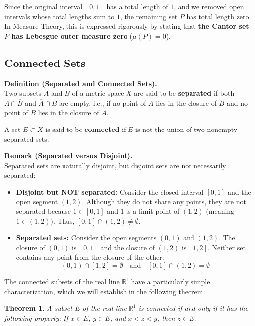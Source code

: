 \documentclass{article}
\theoremstyle{mythm}
\newtheorem{theorem}{Theorem}[section]
\begin{document}
Since the original interval $[0, 1]$ has a total length of $1$, and we removed open intervals whose total lengths sum to $1$, the remaining set $P$ has total length zero. In Measure Theory, this is expressed rigorously by stating that \textbf{the Cantor set $P$ has Lebesgue outer measure zero} ($\mu(P) = 0$).
\subsection*{Connected Sets}

\textbf{Definition (Separated and Connected Sets).} \\
Two subsets $A$ and $B$ of a metric space $X$ are said to be \textbf{separated} if both $A \cap \overline{B}$ and $\overline{A} \cap B$ are empty, i.e., if no point of $A$ lies in the closure of $B$ and no point of $B$ lies in the closure of $A$.

A set $E \subset X$ is said to be \textbf{connected} if $E$ is not the union of two nonempty separated sets.


\textbf{Remark (Separated versus Disjoint).} \\
Separated sets are naturally disjoint, but disjoint sets are not necessarily separated:
\begin{itemize}
    \item \textbf{Disjoint but NOT separated:} Consider the closed interval $[0, 1]$ and the open segment $(1, 2)$. Although they do not share any points, they are not separated because $1 \in [0, 1]$ and $1$ is a limit point of $(1, 2)$ (meaning $1 \in \overline{(1, 2)}$). Thus, $[0, 1] \cap \overline{(1, 2)} \neq \emptyset$.
    \item \textbf{Separated sets:} Consider the open segments $(0, 1)$ and $(1, 2)$. The closure of $(0, 1)$ is $[0, 1]$ and the closure of $(1, 2)$ is $[1, 2]$. Neither set contains any point from the closure of the other:
    \[ (0, 1) \cap [1, 2] = \emptyset \quad \text{and} \quad [0, 1] \cap (1, 2) = \emptyset \]
\end{itemize}

The connected subsets of the real line $\mathbb{R}^1$ have a particularly simple characterization, which we will establish in the following theorem.
\begin{theorem}
A subset $E$ of the real line $\mathbb{R}^1$ is connected if and only if it has the following property: 
If $x \in E$, $y \in E$, and $x < z < y$, then $z \in E$.
\end{theorem}
\end{document}
